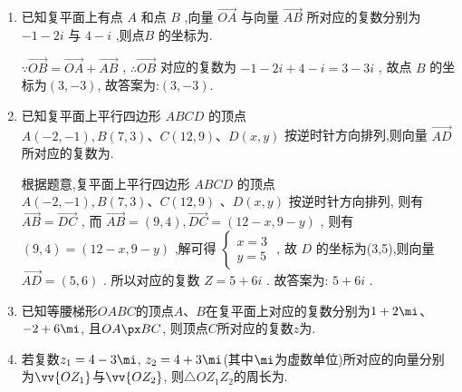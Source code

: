 \begin{enumerate}
    \item 已知复平面上有点 $ A $ 和点 $ B $ ,向量 $ \overrightarrow{OA} $ 与向量 $ \overrightarrow{AB} $ 所对应的复数分别为 $ - 1 - {2i} $ 与 $ 4 - i $ ,则点$ B $ 的坐标为.
    \begin{jieda}
        $ \because \overrightarrow{OB} = \overrightarrow{OA} + \overrightarrow{AB} $ ,
        $ \therefore \overrightarrow{OB} $ 对应的复数为 $ - 1 - {2i} + 4 - i = 3 - {3i} $ ,
        故点 $ B $ 的坐标为$\left( {3, - 3}\right)$,
        故答案为:$\left( {3, - 3}\right)$.
    \end{jieda}
    \item 已知复平面上平行四边形 $ {ABCD} $ 的顶点 $ A\left( {-2, - 1}\right) ,B\left( {7,3}\right) \text{、}C\left( {{12},9}\right) \text{、}D\left( {x,y}\right) $ 按逆时针方向排列,则向量 $ \overrightarrow{AD} $ 所对应的复数为.
    \begin{jieda}
        根据题意,复平面上平行四边形 $ {ABCD} $ 的顶点 $ A\left( {-2, - 1}\right) ,B\left( {7,3}\right) \text{、}C\left( {{12},9}\right) $ 、$ D\left( {x,y}\right) $ 按逆时针方向排列,
        则有 $ \overrightarrow{AB} = \overrightarrow{DC} $ ,
        而 $ \overrightarrow{AB} = \left( {9,4}\right) ,\overrightarrow{DC} = \left( {{12} - x,9 - y}\right) $ ,
        则有 $ \left( {9,4}\right)  = \left( {{12} - x,9 - y}\right) $ ,解可得 $ \left\{  \begin{array}{l} x = 3 \\  y = 5 \end{array}\right. $ ,
        故 $ D $ 的坐标为(3,5),则向量 $ \overrightarrow{AD} = \left( {5,6}\right) $ .
        所以对应的复数 $ Z = 5 + {6i} $ .
        故答案为: $ 5 + {6i} $ .
    \end{jieda}
    
    \item 已知等腰梯形$OABC$的顶点$A$、$B$在复平面上对应的复数分别为$1+2\mi$、$-2+6\mi$, 且$OA\px BC$, 则顶点$C$所对应的复数$z$为. 
    
    \item 若复数$z_1=4-3\mi$, $z_2=4+3\mi$(其中$\mi$为虚数单位)所对应的向量分别为$\vv{OZ_1}$与$\vv{OZ_2}$, 则$\triangle{OZ_1 Z_2}$的周长为. 
    

\end{enumerate}

